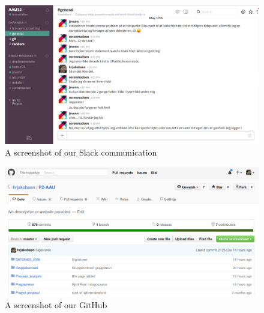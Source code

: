 \begin{figure}
	\centering
	\includegraphics[width=1 \textwidth]{figures/slack.png}
	\caption{A screenshot of our Slack communication}
	\label{fig:slack}
\end{figure}

\begin{figure}
	\centering
	\includegraphics[width=1 \textwidth]{figures/git.png}
	\caption{A screenshot of our GitHub}
	\label{fig:git}
\end{figure}

